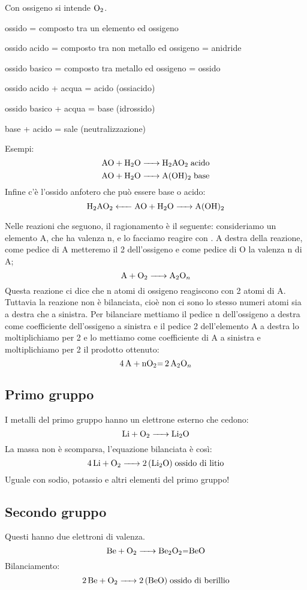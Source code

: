 Con ossigeno si intende \(\ce{ O2 }\).

ossido = composto tra un elemento ed ossigeno

ossido acido = composto tra non metallo ed ossigeno = anidride

ossido basico = composto tra metallo ed ossigeno = ossido

ossido acido + acqua = acido (ossiacido)

ossido basico + acqua = base (idrossido)

base + acido = sale (neutralizzazione)

Esempi:
$$\ce{ AO + H2O -> H2AO2 } \; \text{acido}$$ 
$$\ce{ AO + H2O -> A(OH)_2 } \;  \text{base}$$
Infine c'è l'ossido anfotero che può essere base o acido:
$$\ce{ H_2AO_2 <- AO + H_2O -> A(OH)_2 }$$%

Nelle reazioni che seguono, il ragionamento è il seguente: consideriamo un elemento A, che ha valenza n, e lo facciamo reagire con . A destra della reazione, come pedice di A metteremo il 2 dell'ossigeno e come pedice di O la valenza n di A;
$$\ce{A + O_2 -> A_2O_n}$$
Questa reazione ci dice che n atomi di ossigeno reagiscono con 2 atomi di A. Tuttavia la reazione non è bilanciata, cioè non ci sono lo stesso numeri atomi sia a destra che a sinistra. Per bilanciare mettiamo il pedice n dell'ossigeno a destra come coefficiente dell'ossigeno a sinistra e il pedice 2 dell'elemento A a destra lo moltiplichiamo per 2 e lo mettiamo come coefficiente di A a sinistra e moltiplichiamo per 2 il prodotto ottenuto:
$$\ce{4A + nO_2= 2A_2O_n}$$

\subsection{Primo gruppo}
I metalli del primo gruppo hanno un elettrone esterno che cedono:
$$\ce{ Li + O_2 -> Li_2O }$$
La massa non è scomparsa, l'equazione bilanciata è così:
$$\ce{ 4 Li + O_2 -> 2 (Li_2O) } \; \text{ossido di litio}$$
Uguale con sodio, potassio e altri elementi del primo gruppo!
\subsection{Secondo gruppo}
Questi hanno due elettroni di valenza.
$$\ce{ Be + O_2 -> Be_2O_2=BeO }$$
Bilanciamento:
$$\ce{ 2 Be + O_2 -> 2 (BeO) } \; \text{ossido di berillio}$$
